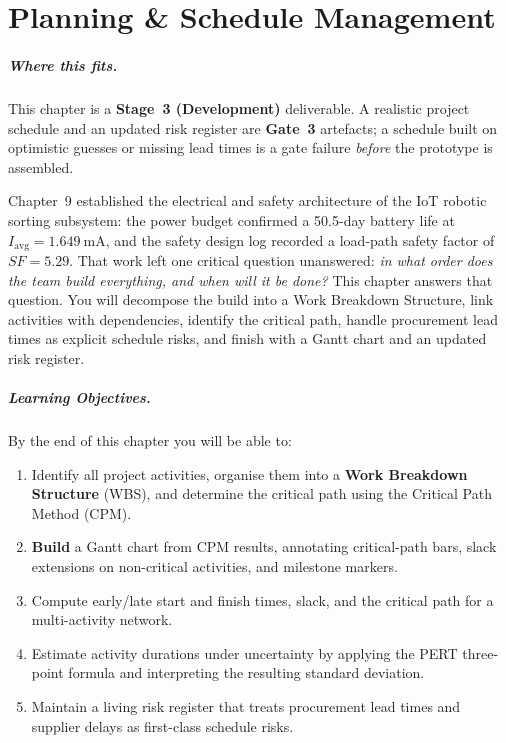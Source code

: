 
\chapter{Planning \& Schedule Management}
\label{ch:planning}

\paragraph{Where this fits.}
This chapter is a \textbf{Stage~3 (Development)} deliverable.
A realistic project schedule and an updated risk register are
\textbf{Gate~3} artefacts; a schedule built on optimistic guesses or
missing lead times is a gate failure \emph{before} the prototype is
assembled.

Chapter~9 established the electrical and safety architecture of the
IoT robotic sorting subsystem: the power budget confirmed a 50.5-day
battery life at $I_{\text{avg}} = 1.649\ \text{mA}$, and the safety
design log recorded a load-path safety factor of $SF = 5.29$.
That work left one critical question unanswered: \emph{in what order
does the team build everything, and when will it be done?}
This chapter answers that question.
You will decompose the build into a Work Breakdown Structure, link
activities with dependencies, identify the critical path, handle
procurement lead times as explicit schedule risks, and finish with a
Gantt chart and an updated risk register.

\paragraph{Learning Objectives.}
By the end of this chapter you will be able to:
\begin{enumerate}
  \item Identify all project activities, organise them into a
        \textbf{Work Breakdown Structure} (WBS), and determine the
        critical path using the Critical Path Method (CPM).
  \item \textbf{Build} a Gantt chart from CPM results, annotating critical-path bars, slack extensions on non-critical activities, and milestone markers.
  \item Compute early/late start and finish times, slack, and the
        critical path for a multi-activity network.
  \item Estimate activity durations under uncertainty by applying the
        PERT three-point formula and interpreting the resulting
        standard deviation.
  \item Maintain a living risk register that treats procurement lead
        times and supplier delays as first-class schedule risks.
\end{enumerate}

